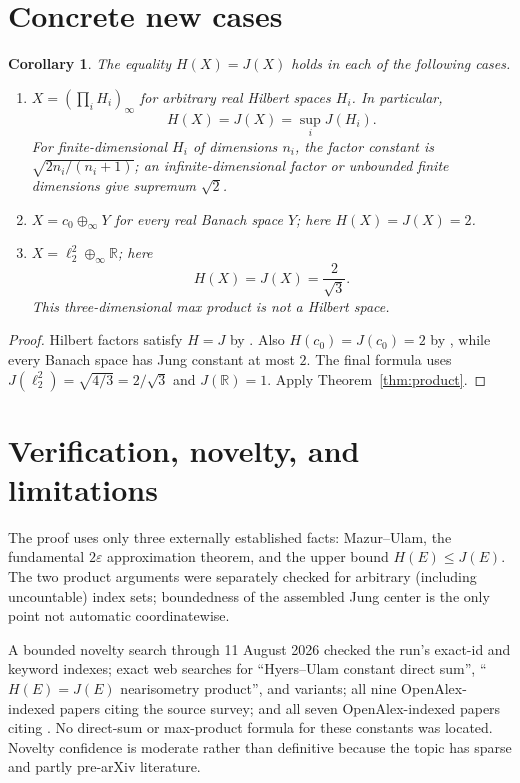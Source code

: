 \documentclass[11pt]{article}
\newtheorem{corollary}[theorem]{Corollary}
\begin{document}
\section{Concrete new cases}

\begin{corollary}\label{cor:examples}
The equality $H(X)=J(X)$ holds in each of the following cases.
\begin{enumerate}
\item $X=(\prod_i H_i)_\infty$ for arbitrary real Hilbert spaces $H_i$.
In particular,
\[
 H(X)=J(X)=\sup_i J(H_i).
\]
For finite-dimensional $H_i$ of dimensions $n_i$, the factor constant is
$\sqrt{2n_i/(n_i+1)}$; an infinite-dimensional factor or unbounded finite
dimensions give supremum $\sqrt2$.
\item $X=c_0\oplus_\infty Y$ for every real Banach space $Y$; here
$H(X)=J(X)=2$.
\item $X=\ell_2^2\oplus_\infty\mathbb R$; here
\[
 H(X)=J(X)=\frac{2}{\sqrt3}.
\]
This three-dimensional max product is not a Hilbert space.
\end{enumerate}
\end{corollary}

\begin{proof}
Hilbert factors satisfy $H=J$ by \cite{HV}.  Also $H(c_0)=J(c_0)=2$ by
\cite[Theorem~3.2]{HV}, while every Banach space has Jung constant at most
$2$.  The final formula uses
$J(\ell_2^2)=\sqrt{4/3}=2/\sqrt3$ and $J(\mathbb R)=1$.
Apply Theorem~\ref{thm:product}.
\end{proof}

\section{Verification, novelty, and limitations}

The proof uses only three externally established facts: Mazur--Ulam, the
fundamental $2\varepsilon$ approximation theorem, and the upper bound
$H(E)\leq J(E)$.  The two product arguments were separately checked for
arbitrary (including uncountable) index sets; boundedness of the assembled
Jung center is the only point not automatic coordinatewise.

A bounded novelty search through 11 August 2026 checked the run's exact-id and
keyword indexes; exact web searches for ``Hyers--Ulam constant direct sum'',
``$H(E)=J(E)$ nearisometry product'', and variants; all nine OpenAlex-indexed
papers citing the source survey; and all seven OpenAlex-indexed papers citing
\cite{HV}.  No direct-sum or max-product formula for these constants was
located.  Novelty confidence is moderate rather than definitive because the
topic has sparse and partly pre-arXiv literature.
\end{document}
